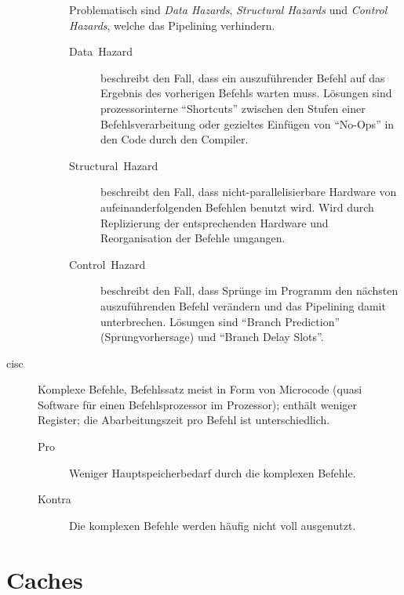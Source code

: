 \begin{description}
\begin{description}
		Problematisch sind \emph{Data Hazards}, \emph{Structural Hazards} und \emph{Control Hazards}, welche das Pipelining verhindern.
		\begin{description}
		  \item [{Data~Hazard}] 
			beschreibt den Fall, dass ein auszuführender Befehl auf das Ergebnis des vorherigen Befehls warten muss.
			Lösungen sind prozessorinterne \enquote{Shortcuts} zwischen den Stufen einer Befehlsverarbeitung oder gezieltes Einfügen von \enquote{No-Ops} in den Code durch den Compiler.
		  \item [{Structural~Hazard}] 
			beschreibt den Fall, dass nicht-parallelisierbare Hardware von aufeinanderfolgenden Befehlen benutzt wird.
			Wird durch Replizierung der entsprechenden Hardware und Reorganisation der Befehle umgangen.
		  \item [{Control~Hazard}] 
			beschreibt den Fall, dass Sprünge im Programm den nächsten auszuführenden Befehl verändern und das Pipelining damit unterbrechen.
			Lösungen sind \enquote{Branch Prediction} (Sprungvorhersage) und \enquote{Branch Delay Slots}.
		\end{description}
	\end{description}

  \item [\gls{cisc}] 
    Komplexe Befehle, Befehlssatz meist in Form von Microcode (quasi Software für einen Befehlsprozessor im Prozessor); enthält weniger Register; die Abarbeitungszeit pro Befehl ist unterschiedlich.
	\begin{description}
	  \item [{Pro}]    Weniger Hauptspeicherbedarf durch die komplexen Befehle.
	  \item [{Kontra}] Die komplexen Befehle werden häufig nicht voll ausgenutzt.
	\end{description}
\end{description}

\section{\label{sec:caches}Caches}

